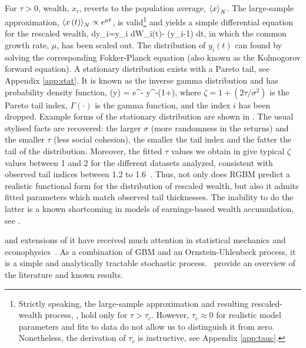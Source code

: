 For $\tau>0$, wealth, $x_i$, reverts to the population average, $\left\langle x \right\rangle_N$. The large-sample approximation, $\left\langle x\left(t\right) \right\rangle_N \propto e^{\mu t}$, is valid\footnote{Strictly speaking, the large-sample approximation and resulting rescaled-wealth process, , hold only for $\tau>\tau_c$. However, $\tau_c \approx 0$ for realistic model parameters and fits to data do not allow us to distinguish it from zero. Nonetheless, the derivation of $\tau_c$ is instructive, see Appendix \ref{app:tauc}.} and yields a simple differential equation for the rescaled wealth,
\be
dy_i=y_i \sigma dW_i\left(t\right)- \tau (y_i-1) dt,
\ee
in which the common growth rate, $\mu$, has been scaled out. The distribution of $y_i\left(t\right)$ can found by solving the corresponding Fokker-Planck equation (also known as the Kolmogorov forward equation). A stationary distribution exists with a Pareto tail, see Appendix \ref{app:stat}. It is known as the inverse gamma distribution and has probability density function,
\be
{}\left(y\right) = \frac{\left(\zeta-1\right)^\zeta}{\Gamma\left(\zeta\right)} e^{-} y^{-\left(1+\zeta\right)},
\ee
where $\zeta=1+\left(2\tau/\sigma^2\right)$ is the Pareto tail index, $\Gamma\left(\cdot\right)$ is the gamma function, and the index $i$ has been dropped. Example forms of the stationary distribution are shown in . The usual stylised facts are recovered: the larger $\sigma$ (more randomness in the returns) and the smaller $\tau$ (less social cohesion), the smaller the tail index and the fatter the tail of the distribution. Moreover, the fitted $\tau$ values we obtain in  give typical $\zeta$ values between 1 and 2 for the different datasets analyzed, consistent with observed tail indices between 1.2 to 1.6~\cite{klass2006forbes,gabaix2009power,brzezinski2014wealth,vermeulen2017fat}. Thus, not only does RGBM predict a realistic functional form for the distribution of rescaled wealth, but also it admits fitted parameters which match observed tail thicknesses. The inability to do the latter is a known shortcoming in models of earnings-based wealth accumulation, see .

 and extensions of it have received much attention in statistical mechanics and econophysics~\cite{BouchaudMezard2000,Bouchaud2015}. As a combination of GBM and an Ornstein-Uhlenbeck process, it is a simple and analytically tractable stochastic process.~\cite{LiuSerota2016} provide an overview of the literature and known results.

